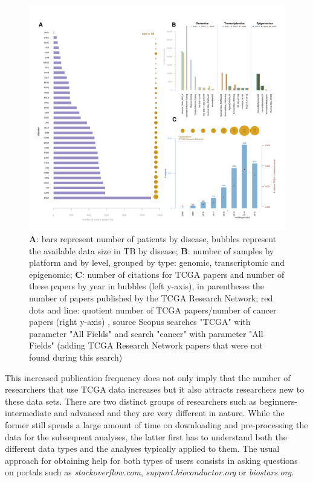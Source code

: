 \begin{figure}
\centering
\includegraphics[width=1.0\textwidth]{images/figure1_draft2.pdf}
\caption{\textbf{A}: bars represent number of patients by disease, bubbles represent the available data size in TB by disease; \textbf{B}: number of samples by platform and by level, grouped by type: genomic, transcriptomic and epigenomic; \textbf{C}: number of citations for TCGA papers and number of these papers by year in bubbles (left y-axis), in parentheses the number of papers published by the TCGA Research Network; red dots and line: quotient number of TCGA papers/number of cancer papers (right y-axis) , source Scopus searches "TCGA" with parameter "All Fields" and search "cancer" with parameter "All Fields" (adding TCGA Research Network papers that were not found during this search)}
\label{fig:my_label}
\end{figure}

This increased publication frequency does not only imply that the number of researchers that use TCGA data increases but it also attracts researchers new to these data sets.
There are two distinct groups of researchers such as beginners-intermediate and advanced and they are very different in nature. 
While the former still spends a large amount of time on downloading and pre-processing the data for the subsequent analyses, the latter first has to understand both the different data types and the analyses typically applied to them. The usual approach for obtaining help for both types of users consists in asking questions on portals such as \textit{stackoverflow.com}, \textit{support.bioconductor.org} or \textit{biostars.org}.\\

